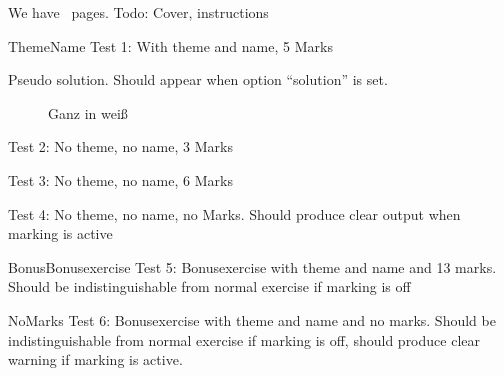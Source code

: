 \documentclass[pdftex,logo,midterm,formula]{newcsen}
\begin{document}
We have \Pages\ pages. Todo: Cover, instructions

\begin{exercise}{5}{Theme}{Name}
  Test 1: With theme and name, 5 Marks
  \begin{solution}
    Pseudo solution. Should appear when option ``solution'' is set.
  \end{solution}
\end{exercise}

\begin{figure}[ht]
  \centering
  \vspace*{3cm}
  \caption{Ganz in weiß}
  \label{fig:test}
\end{figure}

\begin{exercise}{3}{}{}
  Test 2: No theme, no name, 3 Marks
\end{exercise}

\begin{exercise}{6}{}{}
  Test 3: No theme, no name, 6 Marks
\end{exercise}

\begin{exercise}{}{}{}
  Test 4: No theme, no name, no Marks. Should produce clear output
  when marking is active
\end{exercise}

\begin{bonusexercise}{13}{Bonus}{Bonusexercise}
  Test 5: Bonusexercise with theme and name and 13 marks. Should be
  indistinguishable from normal exercise if marking is off
\end{bonusexercise}

\begin{bonusexercise}{}{No}{Marks}
  Test 6: Bonusexercise with theme and name and no marks. Should be
  indistinguishable from normal exercise if marking is off, should
  produce clear warning if marking is active.
\end{bonusexercise}
\end{document}
